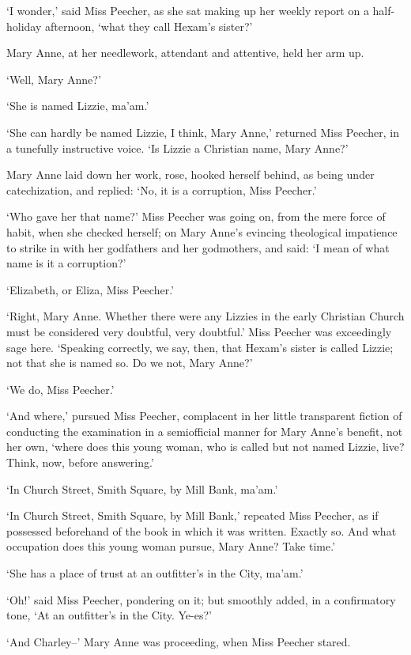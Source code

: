 ‘I wonder,’ said Miss Peecher, as she sat making up her weekly report on
a half-holiday afternoon, ‘what they call Hexam’s sister?’

Mary Anne, at her needlework, attendant and attentive, held her arm up.

‘Well, Mary Anne?’

‘She is named Lizzie, ma’am.’

‘She can hardly be named Lizzie, I think, Mary Anne,’ returned Miss
Peecher, in a tunefully instructive voice. ‘Is Lizzie a Christian name,
Mary Anne?’

Mary Anne laid down her work, rose, hooked herself behind, as being
under catechization, and replied: ‘No, it is a corruption, Miss
Peecher.’

‘Who gave her that name?’ Miss Peecher was going on, from the mere force
of habit, when she checked herself; on Mary Anne’s evincing theological
impatience to strike in with her godfathers and her godmothers, and
said: ‘I mean of what name is it a corruption?’

‘Elizabeth, or Eliza, Miss Peecher.’

‘Right, Mary Anne. Whether there were any Lizzies in the early Christian
Church must be considered very doubtful, very doubtful.’ Miss Peecher
was exceedingly sage here. ‘Speaking correctly, we say, then, that
Hexam’s sister is called Lizzie; not that she is named so. Do we not,
Mary Anne?’

‘We do, Miss Peecher.’

‘And where,’ pursued Miss Peecher, complacent in her little transparent
fiction of conducting the examination in a semiofficial manner for Mary
Anne’s benefit, not her own, ‘where does this young woman, who is called
but not named Lizzie, live? Think, now, before answering.’

‘In Church Street, Smith Square, by Mill Bank, ma’am.’

‘In Church Street, Smith Square, by Mill Bank,’ repeated Miss Peecher,
as if possessed beforehand of the book in which it was written. Exactly
so. And what occupation does this young woman pursue, Mary Anne? Take
time.’

‘She has a place of trust at an outfitter’s in the City, ma’am.’

‘Oh!’ said Miss Peecher, pondering on it; but smoothly added, in a
confirmatory tone, ‘At an outfitter’s in the City. Ye-es?’

‘And Charley--’ Mary Anne was proceeding, when Miss Peecher stared.

